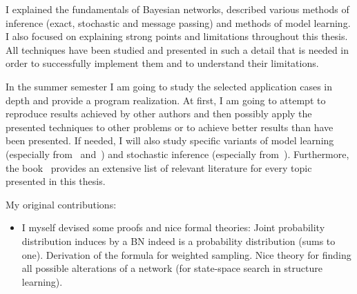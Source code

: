 \documentclass[english,cover]{fitthesis} %
\begin{document}
I explained the fundamentals of Bayesian networks, described various methods of inference (exact, stochastic and message passing) and methods of model learning. I also focused on explaining strong points and limitations throughout this thesis. All techniques have been studied and presented in such a detail that is needed in order to successfully implement them and to understand their limitations.

\medskip

In the summer semester I am going to study the selected application cases in depth and provide a program realization. At first, I am going to attempt to reproduce results achieved by other authors and then possibly apply the presented techniques to other problems or to achieve better results than have been presented. If needed, I will also study specific variants of model learning (especially from~\cite{heckerman96} and~\cite{buntine94}) and stochastic inference (especially from~\cite{neal93}). Furthermore, the book~\cite{pgm} provides an extensive list of relevant literature for every topic presented in this thesis. %

My original contributions:
\begin{itemize}
	\item I myself devised some proofs and nice formal theories: Joint probability distribution induces by a BN indeed is a probability distribution (sums to one). Derivation of the formula for weighted sampling. Nice theory for finding all possible alterations of a network (for state-space search in structure learning).
\end{itemize}











\ifczech
  
\else 
  
%  
\fi
  \begin{flushleft}
  \end{flushleft}
  \appendix
  
\end{document}
